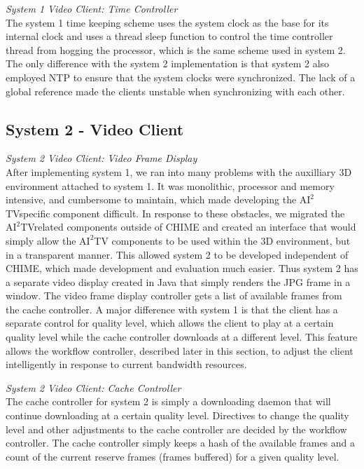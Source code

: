 \documentclass[10pt]{article}
\newcommand{\aiitv}[0]{$\mathrm{AI}^2$TV}
\begin{document}
\textit{System 1 Video Client: Time Controller}  \\
The system 1 time keeping scheme uses the system clock as the base for
its internal clock and uses a thread sleep function to control the
time controller thread from hogging the processor, which is the same
scheme used in system 2.  The only difference with the system 2
implementation is that system 2 also employed NTP to ensure that the
system clocks were synchronized.  The lack of a global reference made
the clients unstable when synchronizing with each other.

\subsection{System 2 - Video Client}

\textit{System 2 Video Client: Video Frame Display}  \\
After implementing system 1, we ran into many problems with the
auxilliary 3D environment attached to system 1.  It was monolithic,
processor and memory intensive, and cumbersome to maintain, which made
developing the \aiitv specific component difficult.  In response to
these obstacles, we migrated the \aiitv related components outside of
CHIME and created an interface that would simply allow the \aiitv
components to be used within the 3D environment, but in a transparent
manner.  This allowed system 2 to be developed independent of CHIME,
which made development and evaluation much easier.  Thus system 2 has
a separate video display created in Java that simply renders the JPG
frame in a window.  The video frame display controller gets a list of
available frames from the cache controller.  A major difference with
system 1 is that the client has a separate control for quality level,
which allows the client to play at a certain quality level while the
cache controller downloads at a different level.  This feature allows
the workflow controller, described later in this section, to adjust
the client intelligently in response to current bandwidth resources.

\textit{System 2 Video Client: Cache Controller}  \\
The cache controller for system 2 is simply a downloading daemon that
will continue downloading at a certain quality level.  Directives to
change the quality level and other adjustments to the cache controller
are decided by the workflow controller.  The cache controller simply
keeps a hash of the available frames and a count of the current
reserve frames (frames buffered) for a given quality level.
\end{document}
